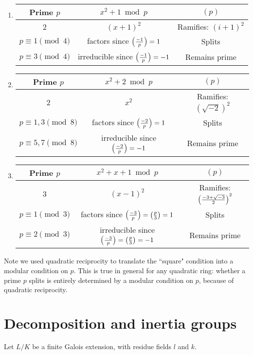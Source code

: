 \begin{ex}$\,$
\begin{enumerate}
\item
\begin{tabular}{|c|c|c|}
\hline 
Prime $p$ & $x^{2}+1\bmod{p}$ & $(p)$\tabularnewline
\hline 
2 & $(x+1)^{2}$ & Ramifies: $(i+1)^{2}$\tabularnewline
\hline 
$p\equiv1\pmod4$ & factors since $\left( {\frac{-1}{p}} \right)=1$ & Splits\tabularnewline
\hline 
$p\equiv3\pmod4$ & irreducible since $\left( {\frac{-1}{p}} \right)=-1$ & Remains prime\tabularnewline
\hline
\end{tabular}
\item
\begin{tabular}{|c|c|c|}
\hline 
Prime $p$ & $x^{2}+2\bmod{p}$ & $(p)$\tabularnewline
\hline 
2 & $x^{2}$ & Ramifies: $(\sqrt{-2})^{2}$\tabularnewline
\hline 
$p\equiv1,3\pmod8$ & factors since $\left( {\frac{-2}{p}} \right)=1$ & Splits\tabularnewline
\hline 
$p\equiv5,7\pmod8$ & irreducible since $\left( {\frac{-2}{p}} \right)=-1$ & Remains prime\tabularnewline
\hline
\end{tabular}
\item
\begin{tabular}{|c|c|c|}
\hline 
Prime $p$ & $x^{2}+x+1\bmod{p}$ & $(p)$\tabularnewline
\hline 
3 & $(x-1)^2$ & Ramifies: $\left( {\frac{-3+\sqrt{-3}}{2}} \right)^2$\tabularnewline
\hline 
$p\equiv1\pmod3$ & factors since $\left( {\frac{-3}{p}} \right)=\left( {\frac{p}{3}} \right)=1$ & Splits\tabularnewline
\hline 
$p\equiv2\pmod3$ & irreducible since $\left( {\frac{-3}{p}} \right)=\left( {\frac{p}{3}} \right)=-1$ & Remains prime\tabularnewline
\hline
\end{tabular}
\end{enumerate}
Note we used quadratic reciprocity to translate the ``square" condition into a modular condition on $p$. This is true in general for any quadratic ring: whether a prime $p$ splits is entirely determined by a modular condition on $p$, because of quadratic reciprocity.
\end{ex}
\section{Decomposition and inertia groups}
Let $L/K$ be a finite Galois extension, with residue fields $l$ and $k$. %

